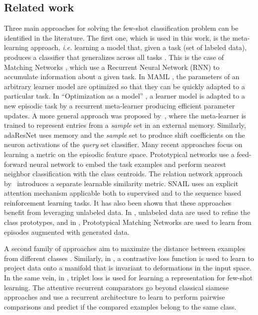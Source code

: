 \documentclass{article}
\begin{document}
\subsection{Related work} \label{ssec:related_work}
Three main approaches for solving the few-shot classification problem can be identified in the literature. The first one, which is used in this work, is the meta-learning approach, \emph{i.e.} learning a model that, given a task (set of labeled data), produces a classifier that generalizes across all tasks \citep{thrun1998lifelong, schmidhuber1997shifting}. This is the case of Matching Networks \citep{vinyals2016matching}, which use a Recurrent Neural Network (RNN) to accumulate information about a given task. In MAML \citep{finn2017model}, the parameters of an arbitrary learner model are optimized so that they can be quickly adapted to a particular task. In ``Optimization as a model'' \citep{ravi2016optimization}, a learner model is adapted to a new episodic task by a recurrent meta-learner producing efficient parameter updates. A more general approach was proposed by~\citet{Santoro16metalearning}, where the meta-learner is trained to represent entries from a \emph{sample} set in an external memory. Similarly, adaResNet \citep{munkhdalai2018rapid} uses memory and the \emph{sample} set to produce shift coefficients on the neuron activations of the \emph{query} set classifier.
Many recent approaches focus on learning a metric on the episodic feature space. Prototypical networks \citep{snell2017prototypical} use a feed-forward neural network to embed the task examples and perform nearest neighbor classification with the class centroids. The relation network approach by~\citet{sung2018learning} introduces a separate learnable similarity metric. SNAIL \citep{mishra2018simle} uses an explicit attention mechanism applicable both to supervised and to the sequence based reinforcement learning tasks. It has also been shown that these approaches benefit from leveraging unlabeled data. In \citet{ren2018meta}, unlabeled data are used to refine the class prototypes, and in \citet{yuxiongwang2017imaginary}, Prototypical Matching Networks are used to learn from episodes augmented with generated data.

A second family of approaches aim to maximize the distance between examples from different classes \citep{koch2015siamese}. Similarly, in \citep{hadsell2006dimensionality}, a contrastive loss function is used to learn to project data onto a manifold that is invariant to deformations in the input space. In the same vein, in \citep{fink2005object, schroff2015facenet, taigman2015web}, triplet loss is used for learning a representation for few-shot learning. The attentive recurrent comparators \citep{shyam2017attentive} go beyond classical siamese approaches and use a recurrent architecture to learn to perform pairwise comparisons and predict if the compared examples belong to the same class.
\end{document}
